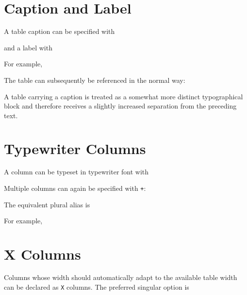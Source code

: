 \documentclass[
11pt,
a4paper,
oneside
]{scrbook}
\begin{document}
\section{Caption and Label}

A table caption can be specified with




and a label with




For example,




The table can subsequently be referenced in the normal way:




A table carrying a caption is treated as a somewhat more distinct
typographical block and therefore receives a slightly increased separation
from the preceding text.

\section{Typewriter Columns}

A column can be typeset in typewriter font with




Multiple columns can again be specified with \texttt{+}:




The equivalent plural alias is




For example,






\section{X Columns}

Columns whose width should automatically adapt to the available table width
can be declared as \texttt{X} columns.
The preferred singular option is
\end{document}
